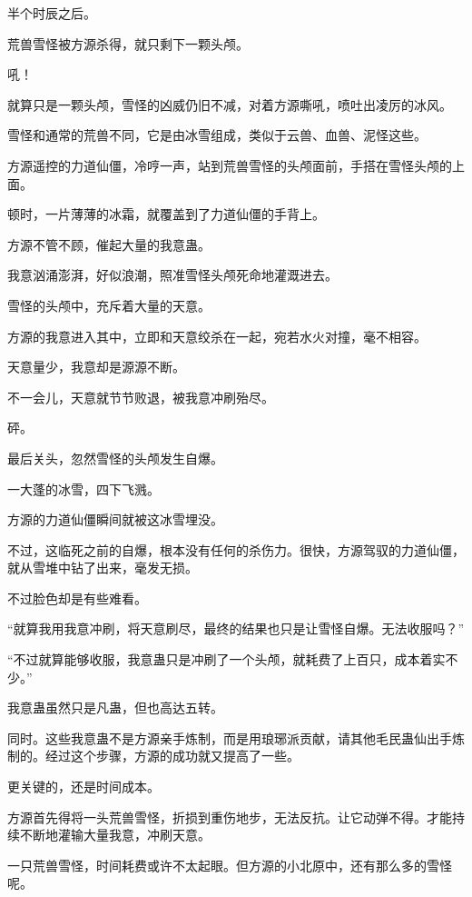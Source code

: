 
\begin{this_body}

半个时辰之后。

荒兽雪怪被方源杀得，就只剩下一颗头颅。

吼！

就算只是一颗头颅，雪怪的凶威仍旧不减，对着方源嘶吼，喷吐出凌厉的冰风。

雪怪和通常的荒兽不同，它是由冰雪组成，类似于云兽、血兽、泥怪这些。

方源遥控的力道仙僵，冷哼一声，站到荒兽雪怪的头颅面前，手搭在雪怪头颅的上面。

顿时，一片薄薄的冰霜，就覆盖到了力道仙僵的手背上。

方源不管不顾，催起大量的我意蛊。

我意汹涌澎湃，好似浪潮，照准雪怪头颅死命地灌溉进去。

雪怪的头颅中，充斥着大量的天意。

方源的我意进入其中，立即和天意绞杀在一起，宛若水火对撞，毫不相容。

天意量少，我意却是源源不断。

不一会儿，天意就节节败退，被我意冲刷殆尽。

砰。

最后关头，忽然雪怪的头颅发生自爆。

一大蓬的冰雪，四下飞溅。

方源的力道仙僵瞬间就被这冰雪埋没。

不过，这临死之前的自爆，根本没有任何的杀伤力。很快，方源驾驭的力道仙僵，就从雪堆中钻了出来，毫发无损。

不过脸色却是有些难看。

“就算我用我意冲刷，将天意刷尽，最终的结果也只是让雪怪自爆。无法收服吗？”

“不过就算能够收服，我意蛊只是冲刷了一个头颅，就耗费了上百只，成本着实不少。”

我意蛊虽然只是凡蛊，但也高达五转。

同时。这些我意蛊不是方源亲手炼制，而是用琅琊派贡献，请其他毛民蛊仙出手炼制的。经过这个步骤，方源的成功就又提高了一些。

更关键的，还是时间成本。

方源首先得将一头荒兽雪怪，折损到重伤地步，无法反抗。让它动弹不得。才能持续不断地灌输大量我意，冲刷天意。

一只荒兽雪怪，时间耗费或许不太起眼。但方源的小北原中，还有那么多的雪怪呢。


\end{this_body}
